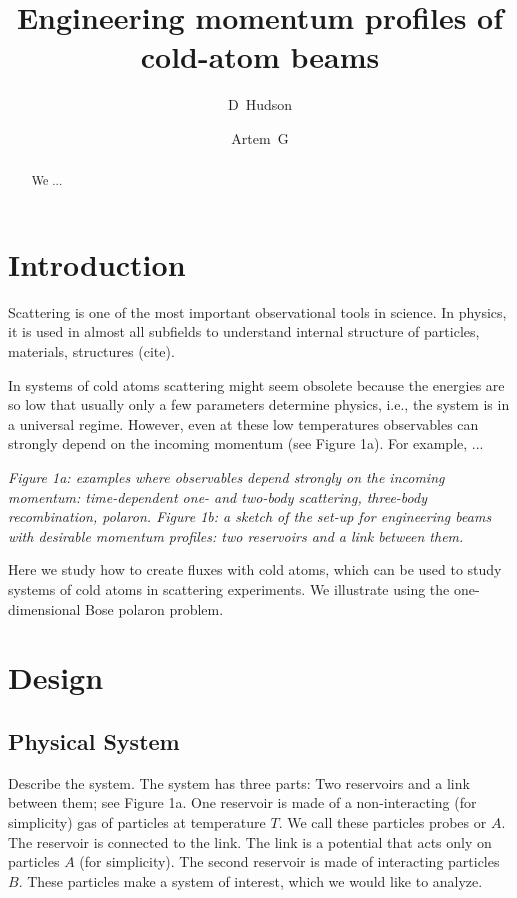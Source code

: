 \documentclass[onecolumn,amsmath,amssymb,nofootinbib,prl]{revtex4-1}
\begin{document}
\title{Engineering momentum profiles of cold-atom beams}

\author{D~Hudson }

\author{Artem~G }



\begin{abstract}
We ...
\end{abstract}


\maketitle

\section{Introduction}

Scattering is one of the most important observational tools in science. In physics, it is used in almost all subfields to understand internal structure of particles, materials, structures (cite).  

In systems of cold atoms scattering might seem obsolete because the energies are so low that usually only a few parameters determine physics, i.e., the system is in a universal regime. However, even at these low temperatures observables can strongly depend on the incoming momentum (see Figure 1a). For example, ...

{\it Figure 1a: examples where observables depend strongly on the incoming momentum: time-dependent one- and two-body scattering, three-body recombination,  polaron. 
Figure 1b: a sketch of the set-up for engineering beams with desirable momentum profiles: two reservoirs and a link between them.}

Here we study how to create fluxes with cold atoms, which can be used to study systems of cold atoms in scattering experiments. We illustrate using the one-dimensional Bose polaron problem.

\section{Design}

\subsection{Physical System}
Describe the system. The system has three parts: Two reservoirs and a link between them; see Figure 1a. One reservoir is made of a non-interacting (for simplicity) gas of particles at temperature $T$. We call these particles probes or $A$. The reservoir is connected to the link. The link is a potential that acts only on particles $A$ (for simplicity). The second reservoir is made of interacting particles $B$. These particles make a system of interest, which we would like to analyze. 
\end{document}
